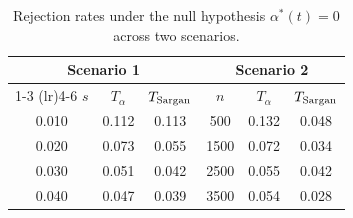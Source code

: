 \begin{table}[H]\centering\small
\caption{Rejection rates under the null hypothesis $\alpha^*(t)=0$ across two scenarios.}\label{tab:S1}
\begin{tabular}{cccccc}
\toprule
\multicolumn{3}{c}{Scenario 1} & \multicolumn{3}{c}{Scenario 2} \\ \cmidrule(lr){1-3} \cmidrule(lr){4-6}
$s$ & $T_\alpha$ & $T_{\rm Sargan}$ & $n$ & $T_\alpha$ & $T_{\rm Sargan}$ \\
\midrule
0.010 & 0.112 & 0.113 & 500 & 0.132 & 0.048 \\
0.020 & 0.073 & 0.055 & 1500 & 0.072 & 0.034 \\
0.030 & 0.051 & 0.042 & 2500 & 0.055 & 0.042 \\
0.040 & 0.047 & 0.039 & 3500 & 0.054 & 0.028 \\
\bottomrule
\end{tabular}
\end{table}

